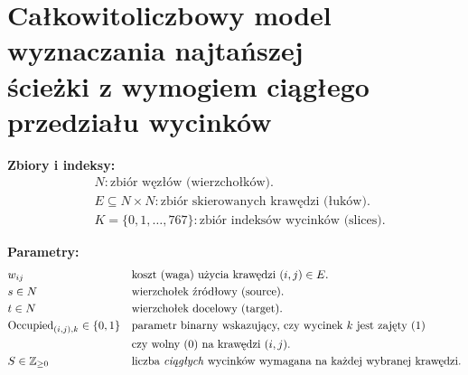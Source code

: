 \documentclass[12pt]{article}
\begin{document}
\section*{Całkowitoliczbowy model wyznaczania najtańszej \\ ścieżki z wymogiem ciągłego przedziału wycinków}

\noindent \textbf{Zbiory i indeksy:}
\begin{align*}
	 & N: \text{zbiór węzłów (wierzchołków).}                              \\
	 & E \subseteq N \times N: \text{zbiór skierowanych krawędzi (łuków).} \\
	 & K = \{0,1,\dots,767\}: \text{zbiór indeksów wycinków (slices).}
\end{align*}

\vspace{1em}

\noindent \textbf{Parametry:}
\begin{align*}
	 & w_{ij}
	 &                                       & \text{koszt (waga) użycia krawędzi }(i,j)\in E.                                                                                    \\
	 & s \in N
	 &                                       & \text{wierzchołek źródłowy (source).}                                                                                              \\
	 & t \in N
	 &                                       & \text{wierzchołek docelowy (target).}                                                                                              \\
	 & \text{Occupied}_{(i,j),k} \in \{0,1\}
	 &                                       & \text{parametr binarny wskazujący, czy wycinek }k \text{ jest zajęty (}1\text{) }                                                  \\
	 &                                       &                                                                                   & \text{czy wolny (}0\text{) na krawędzi }(i,j). \\
	 & S \in \mathbb{Z}_{\ge 0}
	 &                                       & \text{liczba \emph{ciągłych} wycinków wymagana na każdej wybranej krawędzi.}
\end{align*}

\vspace{1em}
\end{document}
